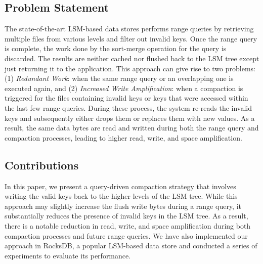 \subsection{Problem Statement}
The state-of-the-art LSM-based data stores performs range queries by retrieving multiple files from various levels and 
filter out invalid keys. Once the range query is complete, the work done by the sort-merge operation for the query is 
discarded. The results are neither cached nor flushed back to the LSM tree except just returning it to the application. This 
approach can give rise to two problems: (1) \textit{Redundant Work}: when the same range query or 
an overlapping one is executed again, and (2) \textit{Increased Write Amplification}: when a compaction is triggered 
for the files containing invalid keys or keys that were accessed within the last few range queries. During these process, 
the system re-reads the invalid keys and subsequently either drops them or replaces them with new values. As a result, 
the same data bytes are read and written during both the range query and compaction processes, leading to higher read, 
write, and space amplification.


\subsection{Contributions}
In this paper, we present a query-driven compaction strategy that involves writing the valid keys back to the higher 
levels of the LSM tree. While this approach may slightly increase the flush write bytes during a range query, it 
substantially reduces the presence of invalid keys in the LSM tree. As a result, there is a notable reduction in read, 
write, and space amplification during both compaction processes and future range queries. We have also implemented our
approach in RocksDB, a popular LSM-based data store and conducted a series of experiments to evaluate its performance.
